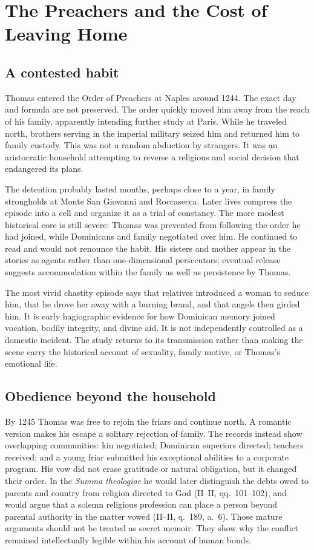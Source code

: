 \section{The Preachers and the Cost of Leaving Home}

\subsection{A contested habit}

Thomas entered the Order of Preachers at Naples around 1244.  The exact day and
formula are not preserved.  The order quickly moved him away from the reach of
his family, apparently intending further study at Paris.  While he traveled
north, brothers serving in the imperial military seized him and returned him
to family custody.  This was not a random abduction by strangers.  It was an
aristocratic household attempting to reverse a religious and social decision
that endangered its plans.

The detention probably lasted months, perhaps close to a year, in family
strongholds at Monte San Giovanni and Roccasecca.  Later lives compress the
episode into a cell and organize it as a trial of constancy.  The more modest
historical core is still severe: Thomas was prevented from following the order
he had joined, while Dominicans and family negotiated over him.  He continued
to read and would not renounce the habit.  His sisters and mother appear in the
stories as agents rather than one-dimensional persecutors; eventual release
suggests accommodation within the family as well as persistence by Thomas.

The most vivid chastity episode says that relatives introduced a woman to
seduce him, that he drove her away with a burning brand, and that angels then
girded him.  It is early hagiographic evidence for how Dominican memory joined
vocation, bodily integrity, and divine aid.  It is not independently controlled
as a domestic incident.  The study returns to its transmission rather than
making the scene carry the historical account of sexuality, family motive, or
Thomas's emotional life.

\subsection{Obedience beyond the household}

By 1245 Thomas was free to rejoin the friars and continue north.  A romantic
version makes his escape a solitary rejection of family.  The records instead
show overlapping communities: kin negotiated; Dominican superiors directed;
teachers received; and a young friar submitted his exceptional abilities to a
corporate program.  His vow did not erase gratitude or natural obligation, but
it changed their order.  In the \emph{Summa theologiae} he would later distinguish
the debts owed to parents and country from religion directed to God (II--II,
qq.~101--102), and would argue that a solemn religious profession can place a
person beyond parental authority in the matter vowed (II--II, q.~189, a.~6).
Those mature arguments should not be treated as secret memoir.  They show why
the conflict remained intellectually legible within his account of human bonds.

